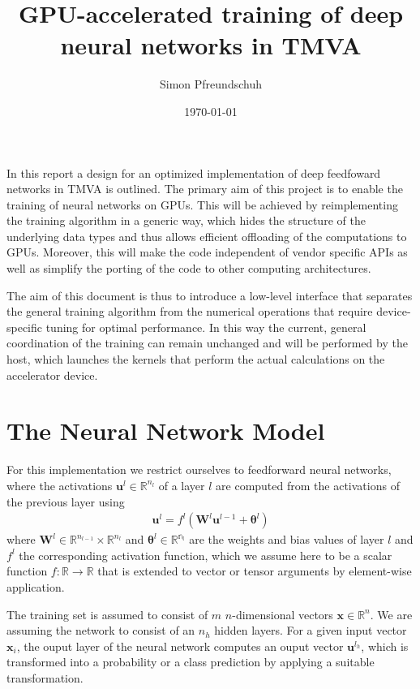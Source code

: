 \documentclass[a4paper,11pt,bibtotoc,xcolor=dvipsnames]{scrartcl}
\title{GPU-accelerated training of deep neural networks in TMVA}
\author{Simon Pfreundschuh}
\date{\today}
\begin{document}

\maketitle

In this report a design for an optimized implementation of deep feedfoward
networks in TMVA is outlined. The primary aim of this project is to enable the
training of neural networks on GPUs. This will be achieved by reimplementing
the training algorithm in a generic way, which hides the structure of the underlying
data types and thus allows efficient offloading of the computations to
GPUs. Moreover, this will make the code independent of vendor specific APIs as
well as simplify the porting of the code to other computing architectures.

The aim of this document is thus to introduce a low-level interface
that separates the general training algorithm from the numerical
operations that require device-specific tuning for optimal
performance. In this way the current, general coordination of the training
can remain unchanged and will be performed by the host, which launches
the kernels that perform the actual calculations on the accelerator
device.

\section{The Neural Network Model}

For this implementation we restrict ourselves to feedforward neural networks,
where the activations $\mathbf{u}^l \in \mathbb{R}^{n_l}$ of a layer $l$ are computed
 from the activations of the previous layer using
\begin{align}
  \mathbf{u}^l = f^l\left(\mathbf{W}^l\mathbf{u}^{l-1} + \boldsymbol{\theta}^l \right)
\end{align}
where $\mathbf{W}^l \in \mathbb{R}^{n_{l-1}}\times\mathbb{R}^{n_l}$ and $\boldsymbol{\theta}^l \in \mathbb{R^{n_l}}$ are
 the weights and bias values of layer $l$ and $f^l$ the corresponding
activation function, which we assume here to be a scalar function
$f:\mathbb{R} \to \mathbb{R}$ that is extended to vector or tensor arguments by
element-wise application.

The training set is assumed to consist of $m$ $n$-dimensional vectors
$\mathbf{x} \in \mathbb{R}^n$. We are assuming the network to
consist of an $n_h$ hidden layers. For a given input vector
$\mathbf{x}_i$, the ouput layer of the neural network computes an
ouput vector $\mathbf{u}^{l_h}$, which is transformed into a
probability or a class prediction by applying a suitable
transformation.
\end{document}
